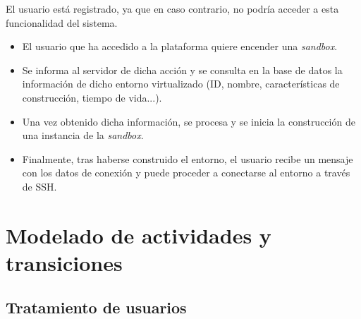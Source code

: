         El usuario está registrado, ya que en caso contrario, no podría acceder a esta funcionalidad del sistema.
        
        \begin{itemize}
            \item El usuario que ha accedido a la plataforma quiere encender una \textit{sandbox}.
            \item Se informa al servidor de dicha acción y se consulta en la base de datos la información de dicho entorno virtualizado (ID, nombre, características de construcción, tiempo de vida...).
            \item Una vez obtenido dicha información, se procesa y se inicia la construcción de una instancia de la \textit{sandbox}.
            \item Finalmente, tras haberse construido el entorno, el usuario recibe un mensaje con los datos de conexión y puede proceder a conectarse al entorno a través de SSH.
        \end{itemize}
        
        \newpage
    
    
    \section{Modelado de actividades y transiciones}
        \label{sec:modelado-actividades-transiciones}
        
        \subsection{Tratamiento de usuarios}
        
